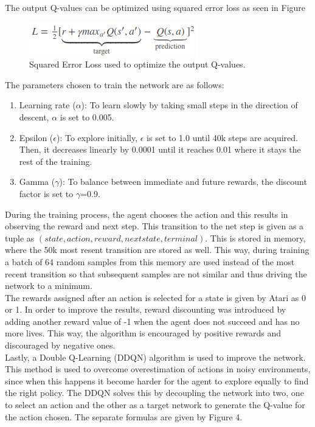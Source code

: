 \documentclass{article}
\begin{document}
The output Q-values can be optimized using squared error loss as seen in Figure 
\begin{figure}[ht]
    \centering
    \includegraphics[width=.5\textwidth]{Loss_function.png}\hfill
    \caption{Squared Error Loss used to optimize the output Q-values.} 
\end{figure}

The parameters chosen to train the network are as follows: 
\begin{enumerate}
    \item Learning rate ($\alpha$): To learn slowly by taking small steps in the direction of descent, $\alpha$ is set to 0.005.
    \item Epsilon ($\epsilon$): To explore initially, $\epsilon$ is set to 1.0 until 40k steps are acquired. Then, it decreases linearly by 0.0001 until it reaches 0.01 where it stays the rest of the training.
    \item Gamma ($\gamma$): To balance between immediate and future rewards, the discount factor is set to $\gamma$=0.9. 
\end{enumerate}

During the training process, the agent chooses the action and this results in observing the reward and next step. This transition to the net step is given as a tuple as $(state, action, reward, next state, terminal)$. This is stored in memory, where the 50k most resent transition are stored as well. This way, during training a batch of 64 random samples from this memory are used instead of the most recent transition so that subsequent samples are not similar and thus driving the network to a minimum. \\

The rewards assigned after an action is selected for a state is given by Atari as 0 or 1. In order to improve the results, reward discounting was introduced by adding another reward value of -1 when the agent does not succeed and has no more lives. This way, the algorithm is encouraged by positive rewards and discouraged by negative ones. \\

Lastly, a Double Q-Learning (DDQN) algorithm is used to improve the network. This method is used to overcome overestimation of actions in noisy environments, since when this happens it become harder for the agent to explore equally to find the right policy. The DDQN solves this by decoupling the network into two, one to select an action and the other as a target network to generate the Q-value for the action chosen. The separate formulas are given by Figure 4.
\end{document}
